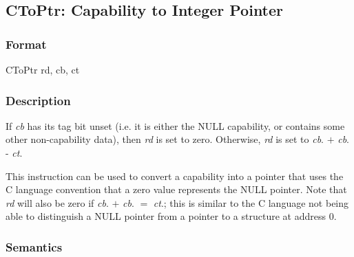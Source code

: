\clearpage
{}
{}
\subsection*{CToPtr: Capability to Integer Pointer}

\subsubsection*{Format}

CToPtr rd, cb, ct

\begin{center}
\end{center}


\subsubsection*{Description}

If \emph{cb} has its tag bit unset (i.e. it is either the
NULL capability, or contains some other non-capability data),
then \emph{rd} is set to zero. Otherwise, \emph{rd} is set to
\emph{cb}.\cbase{} $+$ \emph{cb}.\coffset{} - \emph{ct}.\cbase{}

This instruction can be used to convert a capability into a pointer that
uses the C language convention that a zero value represents the NULL pointer.
Note that \emph{rd} will also be zero if \emph{cb}.\cbase{} $+$
\emph{cb}.\coffset{} $=$ \emph{ct}.\cbase{};
this is similar to the C language not being able to distinguish a
NULL pointer from a pointer to a structure at address 0.

%
%


\subsubsection*{Semantics}

